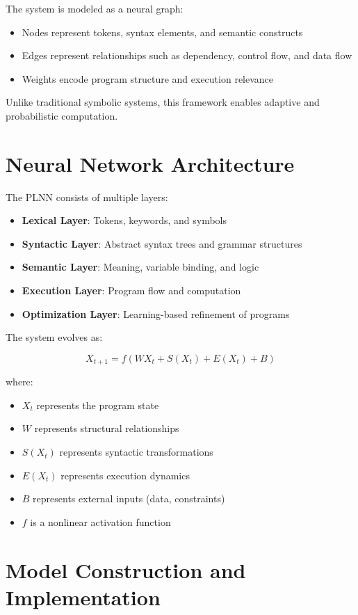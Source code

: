 \documentclass[12pt]{article}
\begin{document}
The system is modeled as a neural graph:

\begin{itemize}
\item Nodes represent tokens, syntax elements, and semantic constructs
\item Edges represent relationships such as dependency, control flow, and data flow
\item Weights encode program structure and execution relevance
\end{itemize}

Unlike traditional symbolic systems, this framework enables adaptive and probabilistic computation.

\section{Neural Network Architecture}

The PLNN consists of multiple layers:

\begin{itemize}
\item \textbf{Lexical Layer}: Tokens, keywords, and symbols
\item \textbf{Syntactic Layer}: Abstract syntax trees and grammar structures
\item \textbf{Semantic Layer}: Meaning, variable binding, and logic
\item \textbf{Execution Layer}: Program flow and computation
\item \textbf{Optimization Layer}: Learning-based refinement of programs
\end{itemize}

The system evolves as:

\[
X_{t+1} = f(WX_t + S(X_t) + E(X_t) + B)
\]

where:
\begin{itemize}
\item $X_t$ represents the program state
\item $W$ represents structural relationships
\item $S(X_t)$ represents syntactic transformations
\item $E(X_t)$ represents execution dynamics
\item $B$ represents external inputs (data, constraints)
\item $f$ is a nonlinear activation function
\end{itemize}

\section{Model Construction and Implementation}
\end{document}
